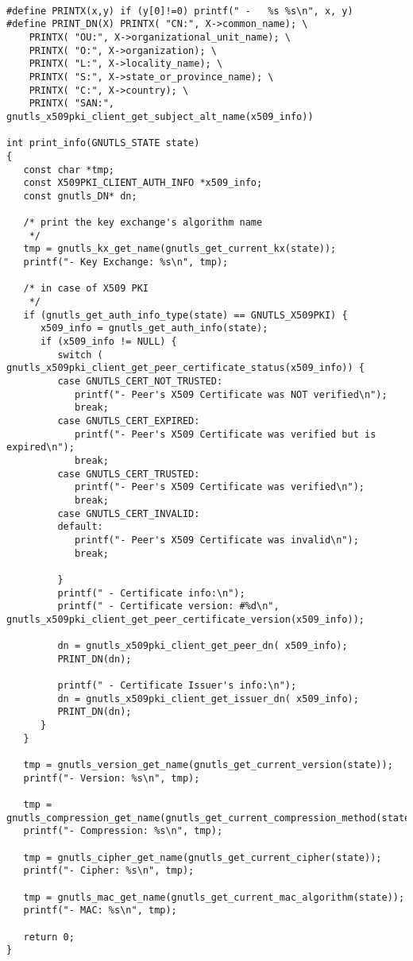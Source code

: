 \begin{verbatim}

#define PRINTX(x,y) if (y[0]!=0) printf(" -   %s %s\n", x, y)
#define PRINT_DN(X) PRINTX( "CN:", X->common_name); \
	PRINTX( "OU:", X->organizational_unit_name); \
	PRINTX( "O:", X->organization); \
	PRINTX( "L:", X->locality_name); \
	PRINTX( "S:", X->state_or_province_name); \
	PRINTX( "C:", X->country); \
	PRINTX( "SAN:", gnutls_x509pki_client_get_subject_alt_name(x509_info))

int print_info(GNUTLS_STATE state)
{
   const char *tmp;
   const X509PKI_CLIENT_AUTH_INFO *x509_info;
   const gnutls_DN* dn;

   /* print the key exchange's algorithm name
    */
   tmp = gnutls_kx_get_name(gnutls_get_current_kx(state));
   printf("- Key Exchange: %s\n", tmp);

   /* in case of X509 PKI
    */
   if (gnutls_get_auth_info_type(state) == GNUTLS_X509PKI) {
      x509_info = gnutls_get_auth_info(state);
      if (x509_info != NULL) {
         switch ( gnutls_x509pki_client_get_peer_certificate_status(x509_info)) {
         case GNUTLS_CERT_NOT_TRUSTED:
            printf("- Peer's X509 Certificate was NOT verified\n");
            break;
         case GNUTLS_CERT_EXPIRED:
            printf("- Peer's X509 Certificate was verified but is expired\n");
            break;
         case GNUTLS_CERT_TRUSTED:
            printf("- Peer's X509 Certificate was verified\n");
            break;
         case GNUTLS_CERT_INVALID:
         default:
            printf("- Peer's X509 Certificate was invalid\n");
            break;

         }
         printf(" - Certificate info:\n");
         printf(" - Certificate version: #%d\n", gnutls_x509pki_client_get_peer_certificate_version(x509_info));

         dn = gnutls_x509pki_client_get_peer_dn( x509_info);
         PRINT_DN(dn);

         printf(" - Certificate Issuer's info:\n");
         dn = gnutls_x509pki_client_get_issuer_dn( x509_info);
         PRINT_DN(dn);
      }
   }

   tmp = gnutls_version_get_name(gnutls_get_current_version(state));
   printf("- Version: %s\n", tmp);

   tmp = gnutls_compression_get_name(gnutls_get_current_compression_method(state));
   printf("- Compression: %s\n", tmp);

   tmp = gnutls_cipher_get_name(gnutls_get_current_cipher(state));
   printf("- Cipher: %s\n", tmp);

   tmp = gnutls_mac_get_name(gnutls_get_current_mac_algorithm(state));
   printf("- MAC: %s\n", tmp);

   return 0;
}

\end{verbatim}
